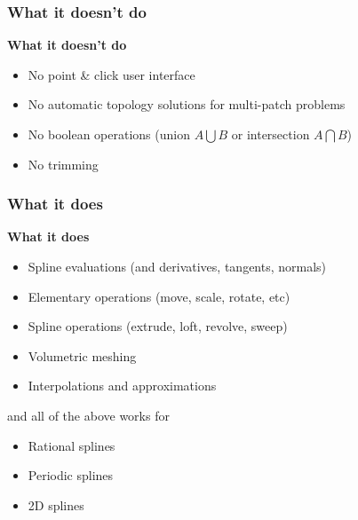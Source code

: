 \documentclass{beamer}
\theoremstyle{plain}
\theoremstyle{definition}
\begin{document}
\begin{frame}
\frametitle{What it doesn't do}
\textbf{What it doesn't do}
\begin{itemize}
    \item No point \& click user interface
    \item No automatic topology solutions for multi-patch problems
    \item No boolean operations (union $A\bigcup B$ or intersection $A\bigcap B$)
    \item No trimming
\end{itemize}
\end{frame}


\begin{frame}
\frametitle{What it does}
\textbf{What it does}
\begin{itemize}
    \item Spline evaluations (and derivatives, tangents, normals)
    \pause
    \item Elementary operations (move, scale, rotate, etc)
    \pause
    \item Spline operations (extrude, loft, revolve, sweep)
    \pause
    \item Volumetric meshing
    \pause
    \item Interpolations and approximations
\end{itemize}
\pause
\vspace{1cm}
and all of the above works for
\begin{itemize}
    \item Rational splines
    \item Periodic splines
    \item 2D splines
\end{itemize}
\end{frame}

\end{document}
